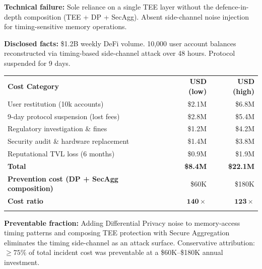 \begin{tcolorbox}[casebox,
  title={Financial Autopsy 3: LedgerNet Side-Channel Attack}]

\textbf{Technical failure:} Sole reliance on a single TEE layer
without the defence-in-depth composition (TEE + DP + SecAgg).
Absent side-channel noise injection for timing-sensitive
memory operations.

\textbf{Disclosed facts:} \$1.2B weekly DeFi volume.
10,000 user account balances reconstructed via timing-based
side-channel attack over 48 hours.
Protocol suspended for 9 days.

\medskip
\begin{tabular}{@{}lrr@{}}
\hline\noalign{\smallskip}
\textbf{Cost Category} & \textbf{USD (low)} & \textbf{USD (high)} \\
\noalign{\smallskip}\svhline\noalign{\smallskip}
User restitution (10k accounts) & \$2.1M & \$6.8M \\
9-day protocol suspension (lost fees) & \$2.8M & \$5.4M \\
Regulatory investigation \& fines & \$1.2M & \$4.2M \\
Security audit \& hardware replacement & \$1.4M & \$3.8M \\
Reputational TVL loss (6 months) & \$0.9M & \$1.9M \\
\noalign{\smallskip}\hline\noalign{\smallskip}
\textbf{Total} & \textbf{\$8.4M} & \textbf{\$22.1M} \\
\noalign{\smallskip}\hline\noalign{\smallskip}
\textbf{Prevention cost (DP + SecAgg composition)} & \$60K & \$180K \\
\textbf{Cost ratio} & $\mathbf{140\times}$ & $\mathbf{123\times}$ \\
\noalign{\smallskip}\hline\noalign{\smallskip}
\end{tabular}

\medskip
\textbf{Preventable fraction:}
Adding Differential Privacy noise to memory-access timing
patterns and composing TEE protection with Secure Aggregation
eliminates the timing side-channel as an attack surface.
Conservative attribution: $\geq 75\%$ of total incident cost
was preventable at a \$60K--\$180K annual investment.
\end{tcolorbox}

